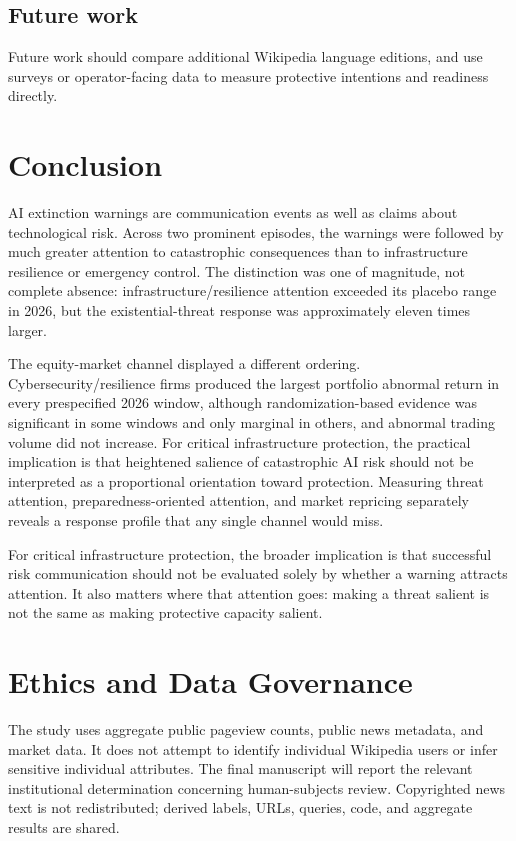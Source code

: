 \elsevierclasstrue\documentclass[preprint,12pt]{elsarticle}%
\begin{document}
\subsection{Future work}

Future work should compare additional Wikipedia language editions, and use surveys or operator-facing data to measure protective intentions and readiness directly.


\section{Conclusion}

AI extinction warnings are communication events as well as claims about technological risk. Across two prominent episodes, the warnings were followed by much greater attention to catastrophic consequences than to infrastructure resilience or emergency control. The distinction was one of magnitude, not complete absence: infrastructure/resilience attention
exceeded its placebo range in 2026, but the existential-threat response was approximately eleven times larger.

The equity-market channel displayed a different ordering. Cybersecurity/resilience firms produced the largest portfolio abnormal return in every prespecified 2026 window, although randomization-based evidence was significant in some windows and only marginal in others, and abnormal trading volume did not increase. For critical infrastructure protection, the practical implication is that heightened salience of catastrophic AI risk should not be interpreted as a proportional orientation toward protection. Measuring threat attention, preparedness-oriented attention, and market repricing separately reveals a response profile that any single channel would miss.

For critical infrastructure protection, the broader implication is that successful risk communication should not be evaluated solely by whether a warning attracts attention. It also matters where that attention goes: making a threat salient is not the same as making protective capacity salient.


\section*{Ethics and Data Governance}

The study uses aggregate public pageview counts, public news metadata, and market data. It does not attempt to identify individual Wikipedia users or infer sensitive individual attributes. The final manuscript will report the relevant institutional determination concerning human-subjects review. Copyrighted news text is not redistributed; derived labels, URLs, queries, code, and aggregate results are shared.
\end{document}
